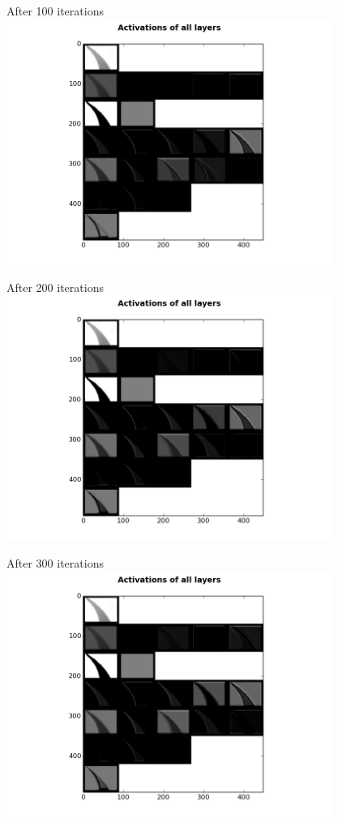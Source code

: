 \begin{frame}{After 100 iterations}
\includegraphics[height=8.0cm]{data/activations/output-100.png}\\ 
\end{frame}

\begin{frame}{After 200 iterations}
\includegraphics[height=8.0cm]{data/activations/output-200.png}\\ 
\end{frame}

\begin{frame}{After 300 iterations}
\includegraphics[height=8.0cm]{data/activations/output-300.png}\\ 
\end{frame}

